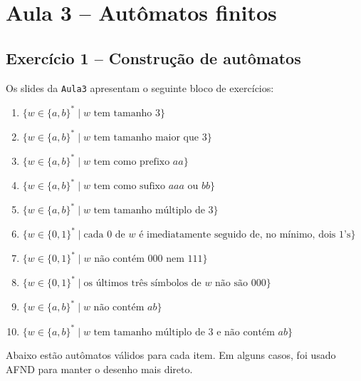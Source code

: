 \documentclass[12pt,a4paper]{article}
\begin{document}
\section*{Aula 3 -- Autômatos finitos}

\subsection*{Exercício 1 -- Construção de autômatos}
Os slides da \texttt{Aula3} apresentam o seguinte bloco de exercícios:
\begin{enumerate}
  \item \( \{w \in \{a,b\}^* \mid w \text{ tem tamanho } 3\} \)
  \item \( \{w \in \{a,b\}^* \mid w \text{ tem tamanho maior que } 3\} \)
  \item \( \{w \in \{a,b\}^* \mid w \text{ tem como prefixo } aa\} \)
  \item \( \{w \in \{a,b\}^* \mid w \text{ tem como sufixo } aaa \text{ ou } bb\} \)
  \item \( \{w \in \{a,b\}^* \mid w \text{ tem tamanho múltiplo de } 3\} \)
  \item \( \{w \in \{0,1\}^* \mid \text{cada } 0 \text{ de } w \text{ é imediatamente seguido de, no mínimo, dois } 1\text{'s}\} \)
  \item \( \{w \in \{0,1\}^* \mid w \text{ não contém } 000 \text{ nem } 111\} \)
  \item \( \{w \in \{0,1\}^* \mid \text{os últimos três símbolos de } w \text{ não são } 000\} \)
  \item \( \{w \in \{a,b\}^* \mid w \text{ não contém } ab\} \)
  \item \( \{w \in \{a,b\}^* \mid w \text{ tem tamanho múltiplo de } 3 \text{ e não contém } ab\} \)
\end{enumerate}

Abaixo estão autômatos válidos para cada item. Em alguns casos, foi usado AFND para manter o desenho mais direto.
\end{document}
